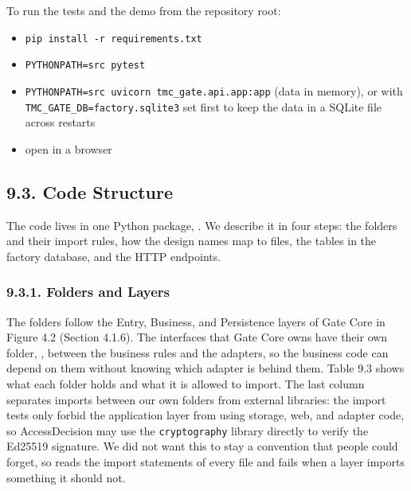 To run the tests and the demo from the repository root:

\begin{itemize}[leftmargin=36pt, itemsep=2pt, topsep=4pt, parsep=2pt]
  \item \texttt{pip install -r requirements.txt}
  \item \texttt{PYTHONPATH=src pytest}
  \item \texttt{PYTHONPATH=src uvicorn tmc\_gate.api.app:app} (data in memory), or with \texttt{TMC\_GATE\_DB=factory.sqlite3} set first to keep the data in a SQLite file across restarts
  \item open  in a browser
\end{itemize}

\subsection*{9.3. Code Structure}

{}

The code lives in one Python package, . We describe it in four steps: the folders and their import rules, how the design names map to files, the tables in the factory database, and the HTTP endpoints.

\subsubsection*{9.3.1. Folders and Layers}

{}

The folders follow the Entry, Business, and Persistence layers of Gate Core in Figure 4.2 (Section 4.1.6). The interfaces that Gate Core owns have their own folder, , between the business rules and the adapters, so the business code can depend on them without knowing which adapter is behind them. Table 9.3 shows what each folder holds and what it is allowed to import. The last column separates imports between our own folders from external libraries: the import tests only forbid the application layer from using storage, web, and adapter code, so AccessDecision may use the \texttt{cryptography} library directly to verify the Ed25519 signature. We did not want this to stay a convention that people could forget, so  reads the import statements of every file and fails when a layer imports something it should not.

